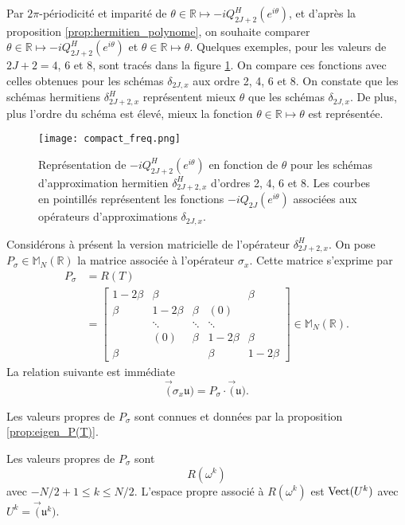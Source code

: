 Par $2 \pi$-périodicité et imparité de $\theta \in \mathbb{R} \mapsto - i Q_{2J+2}^H(e^{i \theta})$, et d'après la proposition \ref{prop:hermitien_polynome}, on souhaite comparer $\theta \in \mathbb{R} \mapsto - i Q_{2J+2}^H(e^{i \theta})$ et $\theta \in \mathbb{R} \mapsto \theta$. Quelques exemples, pour les valeurs de $2J+2 = 4$, $6$ et $8$, sont tracés dans la figure \ref{fig:freq_herm}. On compare ces fonctions avec celles obtenues pour les schémas $\delta_{2J,x}$ aux ordre 2, 4, 6 et 8. On constate que les schémas hermitiens $\delta_{2J+2,x}^H$ représentent mieux $\theta$ que les schémas $\delta_{2J,x}$. De plus, plus l'ordre du schéma est élevé, mieux la fonction $\theta \in \mathbb{R} \mapsto \theta$ est représentée.

\begin{figure}[htbp]
\begin{center}
\texttt{[image: compact\_freq.png]}
\end{center}
\caption{Représentation de $-i Q_{2J+2}^H \left( e^{i \theta} \right)$ en fonction de $\theta$ pour les schémas d'approximation hermitien $\delta_{2J+2,x}^H$ d'ordres 2, 4, 6 et 8. Les courbes en pointillés représentent les fonctions $-i Q_{2J}\left( e^{i \theta} \right)$ associées aux opérateurs d'approximations $\delta_{2J,x}$.}
\label{fig:freq_herm}
\end{figure}


Considérons à présent la version matricielle de l'opérateur $\delta_{2J+2,x}^H$. On pose $P_{\sigma} \in \mathbb{M}_N(\mathbb{R})$ la matrice associée à l'opérateur $\sigma_x$. Cette matrice s'exprime par
\begin{align}
P_{\sigma} & = R(T) \\
  & = \begin{bmatrix}
  1 - 2 \beta & \beta &   &   & \beta \\ 
  \beta & 1 - 2 \beta & \beta & (0) &   \\ 
    & \ddots & \ddots & \ddots &   \\ 
    & (0) & \beta & 1 - 2 \beta & \beta \\ 
  \beta &   &   & \beta & 1 - 2 \beta
  \end{bmatrix} \in \mathbb{M}_{N}(\mathbb{R}).
\end{align}
La relation suivante est immédiate
\begin{equation}
\vec (\sigma_x \mathfrak{u}) = P_{\sigma} \cdot \vec (\mathfrak{u}).
\end{equation}

Les valeurs propres de $P_{\sigma}$ sont connues et données par la proposition \ref{prop:eigen_P(T)}.
\begin{proposition}
Les valeurs propres de $P_{\sigma}$ sont 
\begin{equation}
R(\omega^k)
\end{equation}
avec $-N/2+1 \leq k \leq N/2$. L'espace propre associé à $R(\omega^k)$ est $\text{Vect}(U^k)$ avec $U^k = \vec( \mathfrak{u}^k )$.
\end{proposition}

